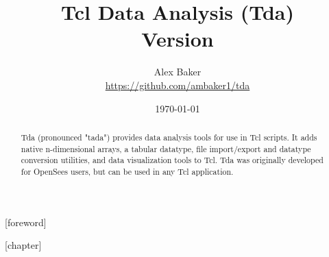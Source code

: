 \documentclass{report}
\title{\Huge{Tcl Data Analysis (Tda)}\\\large Version \version}
\author{Alex Baker\\\small\hyperlink{https://github.com/ambaker1/tda}{https://github.com/ambaker1/tda}}
\date{\small\today}
\renewcommand{\cleartooddpage}[1][]{\ignorespaces} %
\renewcommand{\^}[1]{\textsuperscript{#1}}
\renewcommand{\_}[1]{\textsubscript{#1}}
\begin{document}
    \maketitle
    \begin{abstract}
    Tda (pronounced "tada") provides data analysis tools for use in Tcl scripts. It adds native n-dimensional arrays, a tabular datatype, file import/export and datatype conversion utilities, and data visualization tools to Tcl. Tda was originally developed for OpenSees users, but can be used in any Tcl application.
    \end{abstract}
    [foreword]{}
    \pagestyle{plain}
    \cleartooddpage[\thispagestyle{empty}]
    \tableofcontents
    \markboth{}{}
    \cleartooddpage[\thispagestyle{empty}]
    [chapter]{}
    \pagestyle{main}
    
    
    
    
    
    
    \cleartooddpage[\thispagestyle{empty}]
    \titleformat{\chapter}{\sffamily\bfseries\Huge}{}{0pt}{}
    \printindex
\end{document}
